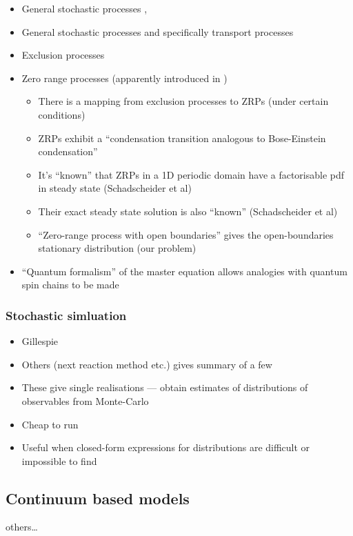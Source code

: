 \begin{itemize}
    \item General stochastic processes \cite{van2007stochastic},
        \cite{gardiner2009stochastic}
    \item General stochastic processes and specifically transport processes
        \cite{schadschneider2010stochastic}
    \item Exclusion processes
    \item Zero range processes (apparently introduced in
        \cite{spitzer1970interaction})
        \begin{itemize}
            \item There is a mapping from exclusion processes to ZRPs (under
                certain conditions)
            \item ZRPs exhibit a ``condensation transition analogous to
                Bose-Einstein condensation''
            \item It's ``known'' that ZRPs in a 1D periodic domain have a
                factorisable pdf in steady state (Schadscheider et al)
            \item Their exact steady state solution is also ``known''
                (Schadscheider et al)
            \item ``Zero-range process with open boundaries'' gives the
                open-boundaries stationary distribution (our problem)
        \end{itemize}
    \item ``Quantum formalism'' of the master equation allows analogies
        with quantum spin chains to be made
\end{itemize}

\subsubsection{Stochastic simluation}
\begin{itemize}
    \item Gillespie \cite{gillespie1976general} \cite{gillespie1977exact}
    \item Others (next reaction method etc.) \cite{anderson2007modified} gives
        summary of a few
    \item These give single realisations --- obtain estimates of distributions
        of observables from Monte-Carlo
    \item Cheap to run
    \item Useful when closed-form expressions for distributions are difficult or
        impossible to find
\end{itemize}

\subsection{Continuum based models}
\cite{chernyavsky2011transport} \cite{chernyavsky2012characterizing}
others\ldots

